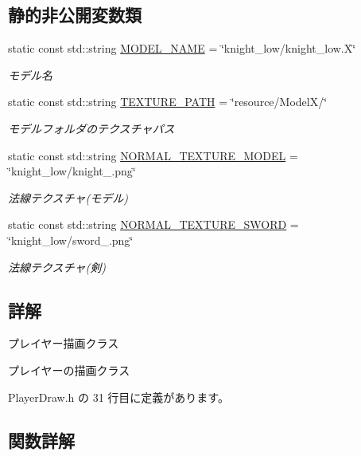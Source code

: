 \subsection*{静的非公開変数類}
\begin{DoxyCompactItemize}
\item 
static const std\+::string \mbox{\hyperlink{class_player_draw_a924cd73d9d8b1b2e662be2c79238354f}{M\+O\+D\+E\+L\+\_\+\+N\+A\+ME}} = \char`\"{}knight\+\_\+low/knight\+\_\+low.\+X\char`\"{}
\begin{DoxyCompactList}\small\item\em モデル名 \end{DoxyCompactList}\item 
static const std\+::string \mbox{\hyperlink{class_player_draw_a808cb174528d55fb35a35b161e262e16}{T\+E\+X\+T\+U\+R\+E\+\_\+\+P\+A\+TH}} = \char`\"{}resource/ModelX/\char`\"{}
\begin{DoxyCompactList}\small\item\em モデルフォルダのテクスチャパス \end{DoxyCompactList}\item 
static const std\+::string \mbox{\hyperlink{class_player_draw_a509edc24db83efdfeda88f12d1d6cc8c}{N\+O\+R\+M\+A\+L\+\_\+\+T\+E\+X\+T\+U\+R\+E\+\_\+\+M\+O\+D\+EL}} = \char`\"{}knight\+\_\+low/knight\+\_.\+png\char`\"{}
\begin{DoxyCompactList}\small\item\em 法線テクスチャ(モデル) \end{DoxyCompactList}\item 
static const std\+::string \mbox{\hyperlink{class_player_draw_aa64bacc93024e21558e2dd9227937bdb}{N\+O\+R\+M\+A\+L\+\_\+\+T\+E\+X\+T\+U\+R\+E\+\_\+\+S\+W\+O\+RD}} = \char`\"{}knight\+\_\+low/sword\+\_.\+png\char`\"{}
\begin{DoxyCompactList}\small\item\em 法線テクスチャ(剣) \end{DoxyCompactList}\end{DoxyCompactItemize}


\subsection{詳解}
プレイヤー描画クラス 

プレイヤーの描画クラス 

 Player\+Draw.\+h の 31 行目に定義があります。



\subsection{関数詳解}
\mbox{\label{class_player_draw_a8b9e8caa6bea7295f58a0aaddeb9458b}} 
